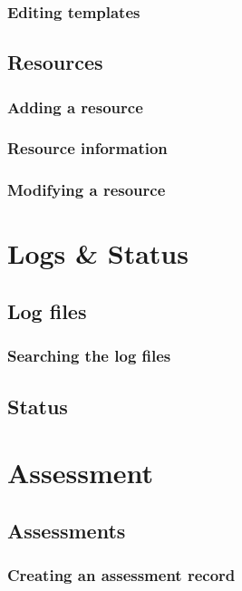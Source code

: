 \documentclass[12 pt]{book}
\begin{document}
\subsection{Editing templates}

\section{Resources}

\subsection{Adding a resource}

\subsection{Resource information}

\subsection{Modifying a resource}

%
%
%

\chapter{Logs \& Status}

\section{Log files}

\subsection{Searching the log files}

\section{Status}

%
%
%

\chapter{Assessment}

\section{Assessments}

\subsection{Creating an assessment record}
\end{document}

